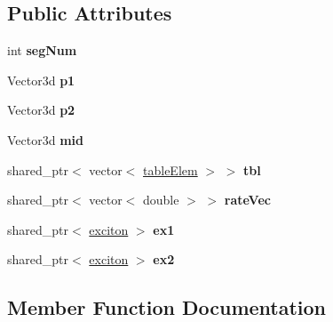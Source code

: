 \subsection*{Public Attributes}
\begin{DoxyCompactItemize}
\item 
\hypertarget{structsegment_a88af35d188a61c0f143b305264732e2d}{}int {\bfseries seg\+Num}\label{structsegment_a88af35d188a61c0f143b305264732e2d}

\item 
\hypertarget{structsegment_a57719a39e7b25ab58de04a8f117ca100}{}Vector3d {\bfseries p1}\label{structsegment_a57719a39e7b25ab58de04a8f117ca100}

\item 
\hypertarget{structsegment_aeea1ee46b786c58d1e3cc51d0311e0bf}{}Vector3d {\bfseries p2}\label{structsegment_aeea1ee46b786c58d1e3cc51d0311e0bf}

\item 
\hypertarget{structsegment_a5830c34d218cbfd07f9f858bde3f1568}{}Vector3d {\bfseries mid}\label{structsegment_a5830c34d218cbfd07f9f858bde3f1568}

\item 
\hypertarget{structsegment_a8c65542fed8e67e93ba9a17599cde748}{}shared\+\_\+ptr$<$ vector$<$ \hyperlink{classtable_elem}{table\+Elem} $>$ $>$ {\bfseries tbl}\label{structsegment_a8c65542fed8e67e93ba9a17599cde748}

\item 
\hypertarget{structsegment_a2cf6f3a4c6e9e166d94464f5420aefa6}{}shared\+\_\+ptr$<$ vector$<$ double $>$ $>$ {\bfseries rate\+Vec}\label{structsegment_a2cf6f3a4c6e9e166d94464f5420aefa6}

\item 
\hypertarget{structsegment_ae0440497155313bad7c3ada09bf08e67}{}shared\+\_\+ptr$<$ \hyperlink{classexciton}{exciton} $>$ {\bfseries ex1}\label{structsegment_ae0440497155313bad7c3ada09bf08e67}

\item 
\hypertarget{structsegment_a5bce2b118ddcbf2517870d496ef28cfd}{}shared\+\_\+ptr$<$ \hyperlink{classexciton}{exciton} $>$ {\bfseries ex2}\label{structsegment_a5bce2b118ddcbf2517870d496ef28cfd}

\end{DoxyCompactItemize}


\subsection{Member Function Documentation}
\hypertarget{structsegment_a6b2606d558b04d89aed43e77192cc5d7}{}
